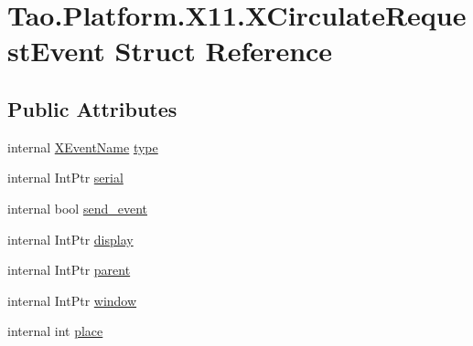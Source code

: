 \hypertarget{struct_tao_1_1_platform_1_1_x11_1_1_x_circulate_request_event}{
\section{Tao.Platform.X11.XCirculateRequestEvent Struct Reference}
\label{struct_tao_1_1_platform_1_1_x11_1_1_x_circulate_request_event}
}
\subsection*{Public Attributes}
\begin{DoxyCompactItemize}
\item 
internal \hyperlink{namespace_tao_1_1_platform_1_1_x11_aff81ed5b8778e1ea8e872861dff9f146}{XEventName} \hyperlink{struct_tao_1_1_platform_1_1_x11_1_1_x_circulate_request_event_a8cff8e8af4ea7c7d6912131c8777ac27}{type}
\item 
internal IntPtr \hyperlink{struct_tao_1_1_platform_1_1_x11_1_1_x_circulate_request_event_ae55e9b0d2a66d5be70b51e518dc87a8d}{serial}
\item 
internal bool \hyperlink{struct_tao_1_1_platform_1_1_x11_1_1_x_circulate_request_event_a54f2870978b17f7f51fb0df77c9ef3e9}{send\_\-event}
\item 
internal IntPtr \hyperlink{struct_tao_1_1_platform_1_1_x11_1_1_x_circulate_request_event_a48c20b23d3d0bde64f9385b262d25c5b}{display}
\item 
internal IntPtr \hyperlink{struct_tao_1_1_platform_1_1_x11_1_1_x_circulate_request_event_a7f1030d81aea251728d64ceb55067881}{parent}
\item 
internal IntPtr \hyperlink{struct_tao_1_1_platform_1_1_x11_1_1_x_circulate_request_event_ad691743b89bf096d2bcc9b2b6685bf7c}{window}
\item 
internal int \hyperlink{struct_tao_1_1_platform_1_1_x11_1_1_x_circulate_request_event_a97a6ea51ed80a3ad82263c8cfaf26279}{place}
\end{DoxyCompactItemize}


